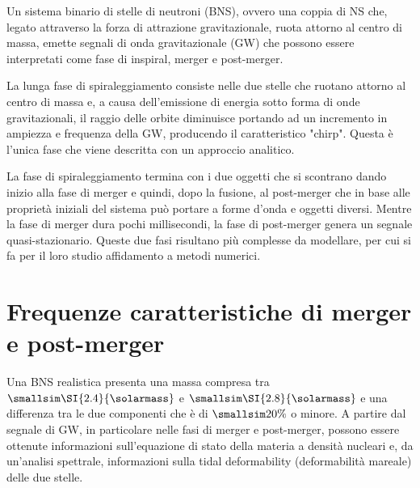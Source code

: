 Un sistema binario di stelle di neutroni (BNS), ovvero una coppia di NS che, legato attraverso la forza di attrazione gravitazionale, ruota attorno al centro di massa, emette segnali di onda gravitazionale (GW) che possono essere interpretati come fase di inspiral, merger e post-merger.

La lunga fase di spiraleggiamento consiste nelle due stelle che ruotano attorno al centro di massa e, a causa dell'emissione di energia sotto forma di onde gravitazionali, il raggio delle orbite diminuisce portando ad un incremento in ampiezza e frequenza della GW, producendo il caratteristico "chirp". Questa è l'unica fase che viene descritta con un approccio analitico.

La fase di spiraleggiamento termina con i due oggetti che si scontrano dando inizio alla fase di merger e quindi, dopo la fusione, al post-merger che in base alle proprietà iniziali del sistema può portare a forme d'onda e oggetti diversi.	Mentre la fase di merger dura pochi millisecondi, la fase di post-merger genera un segnale quasi-stazionario. Queste due fasi risultano più complesse da modellare, per cui si fa per il loro studio affidamento a metodi numerici. \cite{maggiore2008gravitational}

\section[Frequenze caratteristiche]{Frequenze caratteristiche di merger e post-merger}

Una BNS realistica presenta una massa compresa tra $\smallsim\SI{2.4}{\solarmass}$ e $\smallsim\SI{2.8}{\solarmass}$ e una differenza tra le due componenti che è di $\smallsim20\%$ o minore. 
A partire dal segnale di GW, in particolare nelle fasi di merger e post-merger, possono essere ottenute informazioni sull'equazione di stato della materia a densità nucleari e, da un'analisi spettrale, informazioni sulla tidal deformability (deformabilità mareale) delle due stelle.


